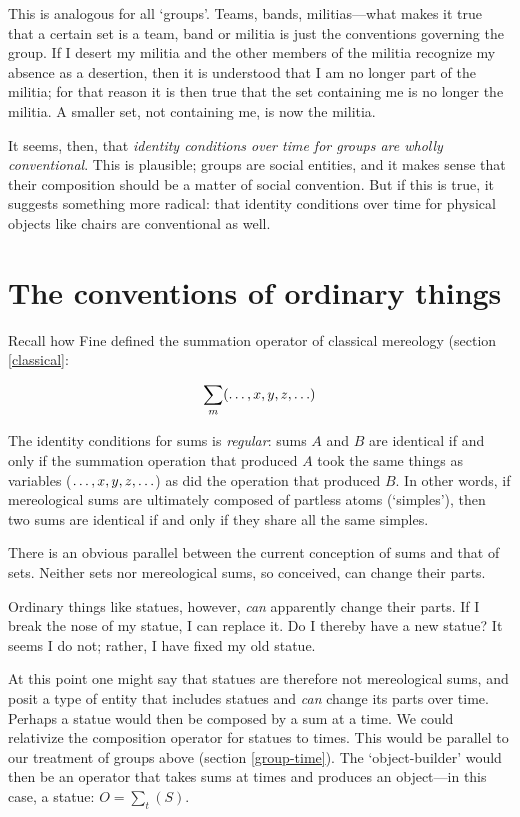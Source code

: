 \documentclass[11pt]{article}
\begin{document}
\begin{spacing}{1.5}
This is analogous for all `groups'.  Teams, bands, militias---what
makes it true that a certain set is a team, band or militia is just
the conventions governing the group.  If I desert my militia and the
other members of the militia recognize my absence as a desertion, then
it is understood that I am no longer part of the militia; for that
reason it is then true that the set containing me is no longer the
militia.  A smaller set, not containing me, is now the militia.

It seems, then, that {\em identity conditions over time for groups are
  wholly conventional}.  This is plausible; groups are social
entities, and it makes sense that their composition should be a matter
of social convention.  But if this is true, it suggests something more
radical: that identity conditions over time for physical objects like
chairs are conventional as well.

\section{The conventions of ordinary things}
Recall how Fine defined the summation operator of classical
mereology (section \ref{classical}:

\begin{displaymath}
\sum _m (\mathellipsis , x, y, z, \mathellipsis )
\end{displaymath}

The identity conditions for sums is {\em regular}: sums $A$ and $B$
are identical if and only if the summation operation that produced $A$
took the same things as variables ($\mathellipsis , x, y, z,
\mathellipsis $) as did the operation that produced $B$.  In other
words, if mereological sums are ultimately composed of partless atoms
(`simples'), then two sums are identical if and only if they share all
the same simples.

There is an obvious parallel between the current conception of sums
and that of sets.  Neither sets nor mereological sums, so conceived,
can change their parts.

Ordinary things like statues, however, {\em can} apparently change
their parts.  If I break the nose of my statue, I can replace it.  Do
I thereby have a new statue?  It seems I do not; rather, I have fixed
my old statue.

At this point one might say that statues are therefore not
mereological sums, and posit a type of entity that includes statues
and {\em can} change its parts over time.  Perhaps a statue would then
be composed by a sum at a time.  We could relativize the composition
operator for statues to times.  This would be parallel to our
treatment of groups above (section \ref{group-time}).  The
`object-builder' would then be an operator that takes sums at times
and produces an object---in this case, a statue: $O = \sum _{t} ( S
)$.


\end{spacing}
\end{document}
